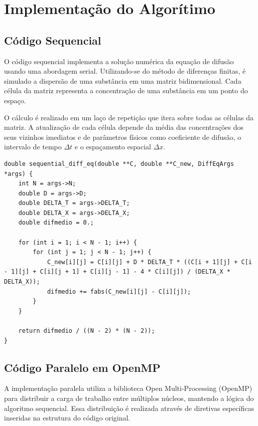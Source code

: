 \documentclass[12pt]{article}
\begin{document}
\section{Implementação do Algorítimo}

\subsection{Código Sequencial}

O código sequencial implementa a solução numérica da equação de difusão usando
uma abordagem serial. Utilizando-se do método de diferenças finitas, é simulado
a dispersão de uma substância em uma matriz bidimensional. Cada célula da
matriz representa a concentração de uma substância em um ponto do espaço.

O cálculo é realizado em um laço de repetição que itera sobre todas as células
da matriz. A atualização de cada célula depende da média das concentrações dos
seus vizinhos imediatos e de parâmetros físicos como coeficiente de difusão, o
intervalo de tempo $\Delta t$ e o espaçamento espacial $\Delta x$.

\begin{lstlisting}[style=CStyle, caption={Código sequencial da para cálculo da difusão, que será utilizado como base para as demais implementações.}, label={cod:seq}]
double sequential_diff_eq(double **C, double **C_new, DiffEqArgs *args) {
    int N = args->N;
    double D = args->D;
    double DELTA_T = args->DELTA_T;
    double DELTA_X = args->DELTA_X;
    double difmedio = 0.;

    for (int i = 1; i < N - 1; i++) {
        for (int j = 1; j < N - 1; j++) {
            C_new[i][j] = C[i][j] + D * DELTA_T * ((C[i + 1][j] + C[i - 1][j] + C[i][j + 1] + C[i][j - 1] - 4 * C[i][j]) / (DELTA_X * DELTA_X));
            difmedio += fabs(C_new[i][j] - C[i][j]);
        }
    }

    return difmedio / ((N - 2) * (N - 2));
}
\end{lstlisting}

\subsection{Código Paralelo em OpenMP}

A implementação paralela utiliza a biblioteca Open Multi-Processing (OpenMP)
para distribuir a carga de trabalho entre múltiplos núcleos, mantendo a lógica
do algoritmo sequencial. Essa distribuição é realizada através de diretivas
específicas inseridas na estrutura do código original.
\end{document}
